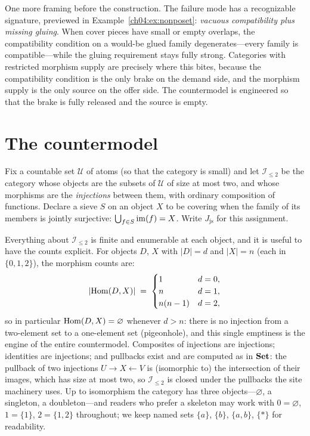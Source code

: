 One more framing before the construction. The failure mode has a
recognizable signature, previewed in Example~\ref{ch04:ex:nonposet}:
\emph{vacuous compatibility plus missing gluing}. When cover pieces have
small or empty overlaps, the compatibility condition on a would-be glued
family degenerates---every family is compatible---while the gluing
requirement stays fully strong. Categories with restricted morphism supply
are precisely where this bites, because the compatibility condition is the
only brake on the demand side, and the morphism supply is the only source on
the offer side. The countermodel is engineered so that the brake is fully
released and the source is empty.

\section{The countermodel}\label{ch06:sec:countermodel}

\begin{definition}\label{ch06:def:inj2}
Fix a countable set $\mathcal{U}$ of atoms (so that the category is small)
and let $\mathcal{I}_{\le 2}$ be the category whose objects are the subsets
of $\mathcal{U}$ of size at most two, and whose morphisms are the
\emph{injections} between them, with ordinary composition of functions.
Declare a sieve $S$ on an object $X$ to be covering when the family of its
members is jointly surjective:
$\bigcup_{f\in S}\mathrm{im}(f)=X$. Write $J_{\mathrm{js}}$ for this assignment.
\end{definition}

Everything about $\mathcal{I}_{\le 2}$ is finite and enumerable at each
object, and it is useful to have the counts explicit. For objects $D$, $X$
with $|D|=d$ and $|X|=n$ (each in $\{0,1,2\}$), the morphism counts are:
\[
|\mathrm{Hom}(D,X)| \;=\;
\begin{cases}
1 & d=0,\\
n & d=1,\\
n(n-1) & d=2,
\end{cases}
\]
so in particular $\mathrm{Hom}(D,X)=\varnothing$ whenever $d>n$: there is no
injection from a two-element set to a one-element set (pigeonhole), and this
single emptiness is the engine of the entire countermodel. Composites of
injections are injections; identities are injections; and pullbacks exist
and are computed as in $\mathbf{Set}$: the pullback of two injections
$U\to X\leftarrow V$ is (isomorphic to) the intersection of their images,
which has size at most two, so $\mathcal{I}_{\le 2}$ is closed under the
pullbacks the site machinery uses. Up to isomorphism the category has three
objects---$\varnothing$, a singleton, a doubleton---and readers who prefer a
skeleton may work with $0=\varnothing$, $1=\{1\}$, $2=\{1,2\}$ throughout;
we keep named sets $\{a\}$, $\{b\}$, $\{a,b\}$, $\{*\}$ for readability.

